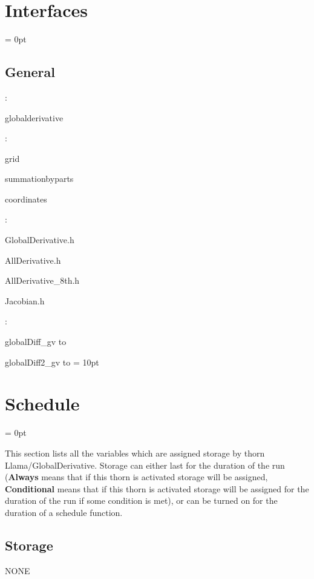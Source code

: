 \documentclass{article}
\begin{document}
\section{Interfaces} 


\parskip = 0pt

\vspace{3mm} \subsection*{General}

: 

globalderivative
\vspace{2mm}

: 

grid

summationbyparts

coordinates
\vspace{2mm}

\vspace{5mm}

: 



GlobalDerivative.h

AllDerivative.h

AllDerivative\_8th.h

Jacobian.h
\vspace{2mm}

: 



globalDiff\_gv to 

globalDiff2\_gv to 
\vspace{2mm}\parskip = 10pt 

\section{Schedule} 


\parskip = 0pt


\noindent This section lists all the variables which are assigned storage by thorn Llama/GlobalDerivative.  Storage can either last for the duration of the run ({\bf Always} means that if this thorn is activated storage will be assigned, {\bf Conditional} means that if this thorn is activated storage will be assigned for the duration of the run if some condition is met), or can be turned on for the duration of a schedule function.


\subsection*{Storage}NONE
\end{document}
